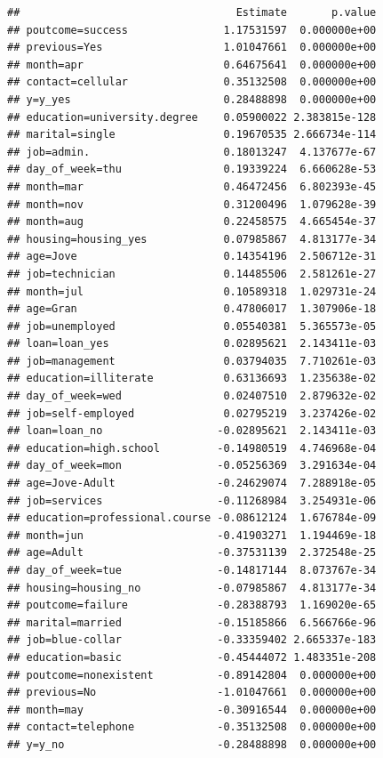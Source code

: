 \documentclass[
]{article}
\begin{document}
\begin{verbatim}
##                                  Estimate       p.value
## poutcome=success               1.17531597  0.000000e+00
## previous=Yes                   1.01047661  0.000000e+00
## month=apr                      0.64675641  0.000000e+00
## contact=cellular               0.35132508  0.000000e+00
## y=y_yes                        0.28488898  0.000000e+00
## education=university.degree    0.05900022 2.383815e-128
## marital=single                 0.19670535 2.666734e-114
## job=admin.                     0.18013247  4.137677e-67
## day_of_week=thu                0.19339224  6.660628e-53
## month=mar                      0.46472456  6.802393e-45
## month=nov                      0.31200496  1.079628e-39
## month=aug                      0.22458575  4.665454e-37
## housing=housing_yes            0.07985867  4.813177e-34
## age=Jove                       0.14354196  2.506712e-31
## job=technician                 0.14485506  2.581261e-27
## month=jul                      0.10589318  1.029731e-24
## age=Gran                       0.47806017  1.307906e-18
## job=unemployed                 0.05540381  5.365573e-05
## loan=loan_yes                  0.02895621  2.143411e-03
## job=management                 0.03794035  7.710261e-03
## education=illiterate           0.63136693  1.235638e-02
## day_of_week=wed                0.02407510  2.879632e-02
## job=self-employed              0.02795219  3.237426e-02
## loan=loan_no                  -0.02895621  2.143411e-03
## education=high.school         -0.14980519  4.746968e-04
## day_of_week=mon               -0.05256369  3.291634e-04
## age=Jove-Adult                -0.24629074  7.288918e-05
## job=services                  -0.11268984  3.254931e-06
## education=professional.course -0.08612124  1.676784e-09
## month=jun                     -0.41903271  1.194469e-18
## age=Adult                     -0.37531139  2.372548e-25
## day_of_week=tue               -0.14817144  8.073767e-34
## housing=housing_no            -0.07985867  4.813177e-34
## poutcome=failure              -0.28388793  1.169020e-65
## marital=married               -0.15185866  6.566766e-96
## job=blue-collar               -0.33359402 2.665337e-183
## education=basic               -0.45444072 1.483351e-208
## poutcome=nonexistent          -0.89142804  0.000000e+00
## previous=No                   -1.01047661  0.000000e+00
## month=may                     -0.30916544  0.000000e+00
## contact=telephone             -0.35132508  0.000000e+00
## y=y_no                        -0.28488898  0.000000e+00
\end{verbatim}
\end{document}
